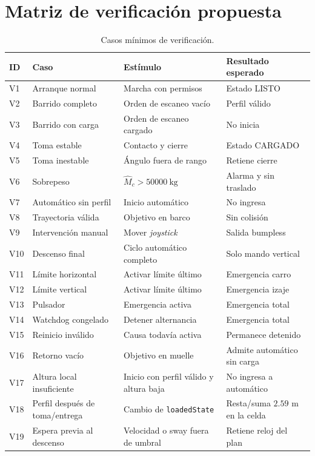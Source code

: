 \documentclass[a4paper,10pt,onecolumn,journal]{ieeeconf}
\numberwithin{equation}{section}
\renewcommand{\arraystretch}{1.35}
\begin{document}
\section{Matriz de verificación propuesta}
{\small
\renewcommand{\arraystretch}{1.10}
\begin{table}[H]
\centering
\caption{Casos mínimos de verificación.}
\begin{tabular}{C{1.2cm} L{5.0cm} L{4.0cm} L{4.0cm}}
\toprule
ID & Caso & Estímulo & Resultado esperado\\
\midrule
V1 & Arranque normal & Marcha con permisos & Estado LISTO\\
V2 & Barrido completo & Orden de escaneo vacío & Perfil válido\\
V3 & Barrido con carga & Orden de escaneo cargado & No inicia\\
V4 & Toma estable & Contacto y cierre & Estado CARGADO\\
V5 & Toma inestable & Ángulo fuera de rango & Retiene cierre\\
V6 & Sobrepeso & $\widehat M_c>50000~\mathrm{kg}$ & Alarma y sin traslado\\
V7 & Automático sin perfil & Inicio automático & No ingresa\\
V8 & Trayectoria válida & Objetivo en barco & Sin colisión\\
V9 & Intervención manual & Mover \textit{joystick} & Salida bumpless\\
V10 & Descenso final & Ciclo automático completo & Solo mando vertical\\
V11 & Límite horizontal & Activar límite último & Emergencia carro\\
V12 & Límite vertical & Activar límite último & Emergencia izaje\\
V13 & Pulsador & Emergencia activa & Emergencia total\\
V14 & Watchdog congelado & Detener alternancia & Emergencia total\\
V15 & Reinicio inválido & Causa todavía activa & Permanece detenido\\
V16 & Retorno vacío & Objetivo en muelle & Admite automático sin carga\\
V17 & Altura local insuficiente & Inicio con perfil válido y altura baja & No ingresa a automático\\
V18 & Perfil después de toma/entrega & Cambio de \texttt{loadedState} & Resta/suma $2.59$ m en la celda\\
V19 & Espera previa al descenso & Velocidad o sway fuera de umbral & Retiene reloj del plan\\
\bottomrule
\end{tabular}
\end{table}
}
\end{document}
